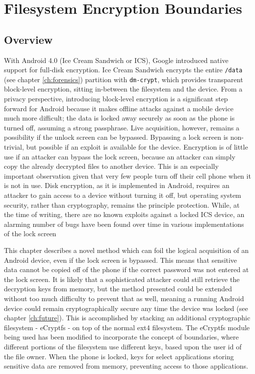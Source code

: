 \chapter{Filesystem Encryption Boundaries}
\label{ch:ecryptfs}

\section{Overview} 
With Android 4.0 (Ice Cream Sandwich or ICS), Google introduced native support for full-disk encryption. Ice Cream Sandwich encrypts
the entire \texttt{/data} (see chapter \ref{ch:forensics}) partition with \texttt{dm-crypt}, which provides transparent block-level
encryption, sitting in-between the filesystem and the device. From a privacy perspective, introducing block-level encryption is a
significant step forward for Android because it makes offline attacks against a mobile device much more difficult; the data is
locked away securely as soon as the phone is turned off, assuming a strong passphrase. Live acquisition, however, remains a
possibility if the unlock screen can be bypassed.  Bypassing a lock screen is non-trivial, but possible if an exploit is available
for the device. Encryption is of little use if an attacker can bypass the lock screen, because an attacker can simply copy the
already decrypted files to another device.  This is an especially important observation given that very few people turn off their
cell phone when it is not in use. Disk encryption, as it is implemented in Android, requires an attacker to gain access to a device
without turning it off, but operating system security, rather than cryptography, remains the principle protection. While, at the
time of writing, there are no known exploits against a locked ICS device, an alarming number of bugs have been found over time in
various implementations of the lock screen \cite{hoog, lockscreenbypass0, lockscreenbypass1, lockscreenbypass2}

This chapter describes a novel method which can foil the logical acquisition of an Android device, even if the lock screen is
bypassed. This means that sensitive data cannot be copied off of the phone if the correct password was not entered at the lock
screen. It is likely that a sophisticated attacker could still retrieve the decryption keys from memory, but the method presented
could be extended without too much difficulty to prevent that as well, meaning a running Android device could remain
cryptographically secure any time the device was locked (see chapter \ref{ch:future}). This is accomplished by stacking an
additional cryptographic filesystem - eCryptfs - on top of the normal ext4 filesystem. The eCryptfs module being used
has been modified to incorporate the concept of boundaries, where different portions of the filesystem use different keys, based
upon the user id of the file owner. When the phone is locked, keys for select applications storing sensitive data are removed from
memory, preventing access to those applications.

